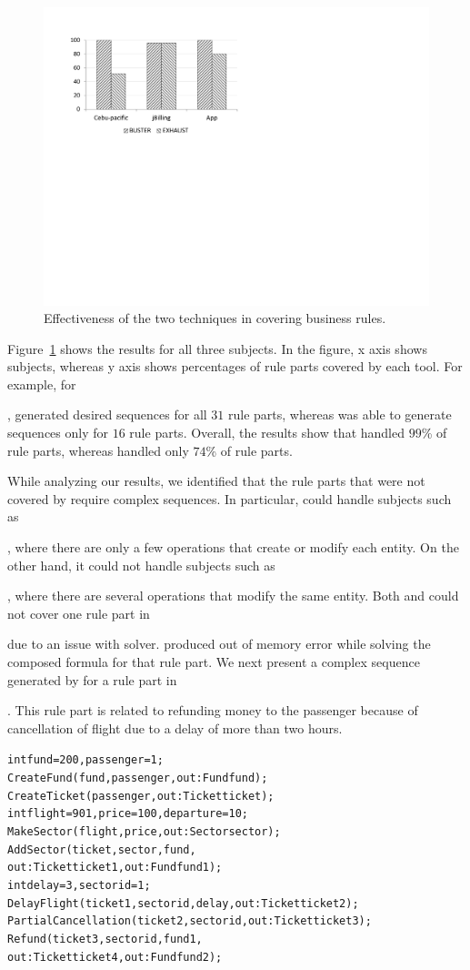 \begin{figure}[t]
\centering
\includegraphics[width=0.7\columnwidth, clip, trim = 18mm 120mm 140mm
  18mm]{figs/Study-1.pdf}
\caption{Effectiveness of the two techniques in covering business rules.}
\label{fig:effectiveness}
\end{figure}

Figure~\ref{fig:effectiveness} shows the results for all three subjects. 
In the figure, x axis shows subjects, whereas y axis shows percentages of rule parts
covered by each tool. For example, for \subject{Cebu-pacific},
\tool{} generated desired sequences for all $31$ rule parts, whereas \exhaust{} was able
to generate sequences only for $16$ rule parts. Overall, the results show 
that \tool{} handled $99$\% of rule parts, whereas \exhaust{}
handled only $74$\% of rule parts.

While analyzing our results, we identified that the rule parts that were 
not covered by \exhaust{} require complex sequences. In particular, \exhaust{}
could handle subjects such as \subject{jBilling}, where there are only a few
operations that create or modify each entity. On the other hand, it could not
handle subjects such as \subject{Cebu-pacific}, where there are several operations
that modify the same entity. Both \tool{} and \exhaust{} could not cover 
one rule part in \subject{jBilling} due to an issue with \choco{} solver. \choco{} produced
out of memory error while solving the composed formula for that rule part. We next present a complex sequence
generated by \tool{} for a rule part in \subject{Cebu-pacific}. This rule part is
related to refunding money to the passenger because of cancellation of flight due
to a delay of more than two hours.

{\scriptsize
\begin{alltt}
 int fund = 200, passenger = 1;
 CreateFund(fund, passenger, out: Fund fund);
 CreateTicket(passenger, out: Ticket ticket);
 int flight = 901, price = 100, departure = 10; 
 MakeSector(flight, price, out: Sector sector);
 AddSector(ticket, sector, fund,  
                out: Ticket ticket1, out: Fund fund1);
 int delay = 3, sectorid = 1; 
 DelayFlight(ticket1, sectorid, delay, out: Ticket ticket2);
 PartialCancellation(ticket2, sectorid, out: Ticket ticket3);
 Refund(ticket3, sectorid, fund1, 
                out: Ticket ticket4, out: Fund fund2);
\end{alltt}
}

